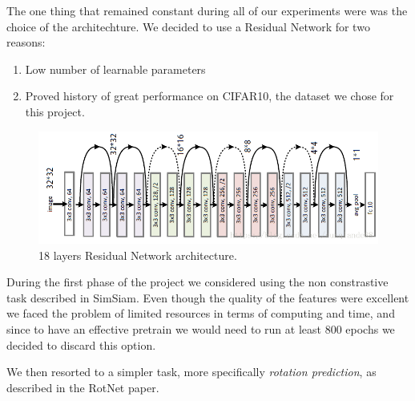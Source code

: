 \documentclass{article}
\begin{document}
\begin{flushleft}
The one thing that remained constant during all of our experiments 
were was the choice of the architechture. 
We decided to use a Residual Network for two reasons:
\begin{enumerate}
    \item Low number of learnable parameters
    \item Proved history of great performance on CIFAR10, the dataset we chose for this project.
\end{enumerate}
\begin{figure}[h]
    \centering
    \includegraphics[scale=0.46]{resnet18}
    \caption{ 18 layers Residual Network architecture. }
\end{figure}
During the first phase of the project we considered using the non constrastive task 
described in SimSiam. Even though the quality of the features were excellent 
we faced the problem of limited resources in terms of computing and time, 
and since to have an effective pretrain we would need to run at least 800 epochs 
we decided to discard this option.
\end{flushleft}
\begin{flushleft}
We then resorted to a simpler task, more specifically \emph{rotation prediction}, 
as described in the RotNet paper.
\end{flushleft}
\end{document}
